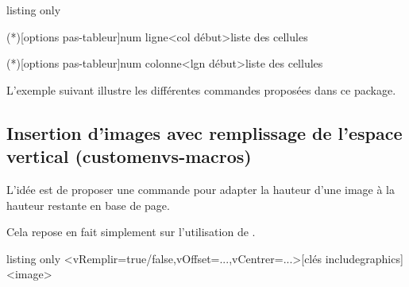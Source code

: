 \documentclass[french,11pt,a4paper]{article}
\begin{document}
\begin{DemoCode}{listing only}
\usepackage[pastableur]{customenvs}




\lignetxt(*)[options pas-tableur]{num ligne}<col début>{liste des cellules}

\colonnetxt(*)[options pas-tableur]{num colonne}<lgn début>{liste des cellules}
\end{DemoCode}

\pagebreak

L'exemple suivant illustre les différentes commandes proposées dans ce package.

\begin{DemoCode}{}
\end{DemoCode}

\subsection{Insertion d'images avec remplissage de l'espace vertical (customenvs-macros)}

L'idée est de proposer une commande pour adapter la hauteur d'une image à la hauteur restante en base de page.

Cela repose en fait simplement sur l'utilisation de \MontreCode{[height=\textbackslash dimexpr\textbackslash pagegoal-\textbackslash pagetotal\textbackslash relax]}.

\begin{DemoCode}{listing only}
\InsererImage<vRemplir=true/false,vOffset=...,vCentrer=...>[clés includegraphics]<image>
\end{DemoCode}
\end{document}
